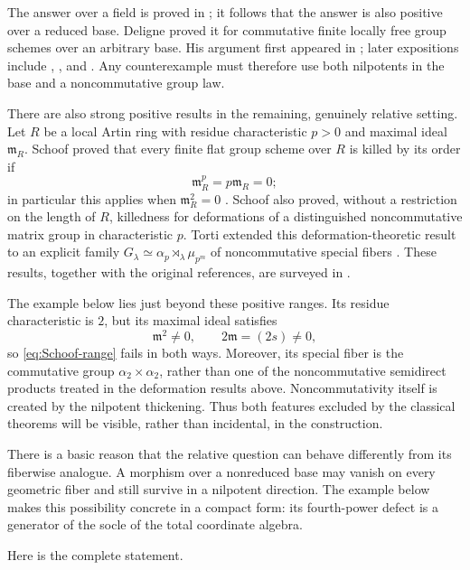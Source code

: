 \documentclass[11pt]{amsart}
\theoremstyle{definition}
\theoremstyle{remark}
\begin{document}
The answer over a field is proved in
\cite[Exp.~VIIA, Prop.~8.5]{SGA3I}; it follows that the answer is also
positive over a reduced base.  Deligne proved it for commutative finite
locally free group schemes over an arbitrary base.  His argument first
appeared in \cite[\S1]{OortTate}; later expositions include
\cite[\S3.8]{TateFiniteFlat}, \cite[\S3.3]{Stix}, and
\cite[\S3]{SchoofSurvey}.  Any counterexample must therefore use both
nilpotents in the base and a noncommutative group law.

There are also strong positive results in the remaining, genuinely
relative setting.  Let \(R\) be a local Artin ring with residue
characteristic \(p>0\) and maximal ideal \(\mathfrak m_R\).  Schoof proved
that every finite flat group scheme over \(R\) is killed by its order if
\begin{equation}\label{eq:Schoof-range}
 \mathfrak m_R^p=p\mathfrak m_R=0;
\end{equation}
in particular this applies when \(\mathfrak m_R^2=0\)
\cite{Schoof2001,SchoofSurvey}.  Schoof also proved, without a restriction
on the length of \(R\), killedness for deformations of a distinguished
noncommutative matrix group in characteristic \(p\).  Torti extended this
deformation-theoretic result to an explicit family
\(G_\lambda\simeq\alpha_p\rtimes_\lambda\mu_{p^m}\) of noncommutative
special fibers \cite{Torti}.  These results, together
with the original references, are surveyed in
\cite{SchoofSurvey,Torti}.

The example below lies just beyond these positive ranges.  Its residue
characteristic is \(2\), but its maximal ideal satisfies
\[
 \mathfrak m^2\ne0,
 \qquad
 2\mathfrak m=(2s)\ne0,
\]
so \eqref{eq:Schoof-range} fails in both ways.  Moreover, its special fiber
is the commutative group \(\alpha_2\times\alpha_2\), rather than one of the
noncommutative semidirect products treated in the deformation results
above.  Noncommutativity itself is created by the nilpotent thickening.
Thus both features excluded by the classical theorems will be visible,
rather than incidental, in the construction.

There is a basic reason that the relative question can behave differently
from its fiberwise analogue.  A morphism over a nonreduced base may vanish
on every geometric fiber and still survive in a nilpotent direction.  The
example below makes this possibility concrete in a compact form: its
fourth-power defect is a generator of the socle of the total
coordinate algebra.

Here is the complete statement.
\end{document}
